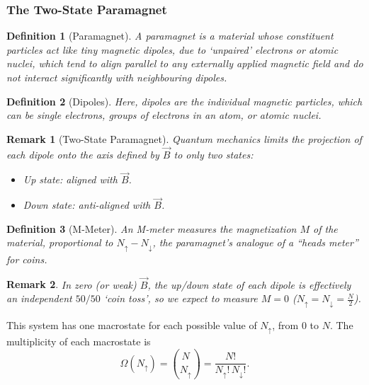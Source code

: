\documentclass{article}
\newtheorem{definition}{Definition}
\newtheorem{remark}{Remark}
\begin{document}
\subsubsection{The Two-State Paramagnet}
\begin{definition}[Paramagnet]
    A paramagnet is a material whose constituent particles act like tiny magnetic dipoles, due to `unpaired' electrons or atomic nuclei, which tend to align parallel to any externally applied magnetic field and do not interact significantly with neighbouring dipoles.
\end{definition}
\begin{definition}[Dipoles]
    Here, dipoles are the individual magnetic particles, which can be single electrons, groups of electrons in an atom, or atomic nuclei.
\end{definition}
\begin{remark}[Two-State Paramagnet]
    Quantum mechanics limits the projection of each dipole onto the axis defined by $\vec{B}$ to only two states:
    \begin{itemize}
        \item Up state: aligned with $\vec{B}$.
        \item Down state: anti-aligned with $\vec{B}$.
    \end{itemize}
\end{remark}
\begin{definition}[M-Meter]
    An M-meter measures the magnetization $M$ of the material, proportional to $N_\uparrow - N_\downarrow$, the paramagnet's analogue of a ``heads meter'' for coins.
\end{definition}
\begin{remark}
    In zero (or weak) $\vec{B}$, the up/down state of each dipole is effectively an independent $50/50$ `coin toss', so we expect to measure $M = 0$ ($N_\uparrow = N_\downarrow = \frac{N}{2}$).
\end{remark}
This system has one macrostate for each possible value of $N_\uparrow$, from $0$ to $N$. The multiplicity of each macrostate is
\[\Omega(N_\uparrow) = \binom{N}{N_\uparrow} = \frac{N!}{N_\uparrow!\,N_\downarrow!}.\]
\end{document}
